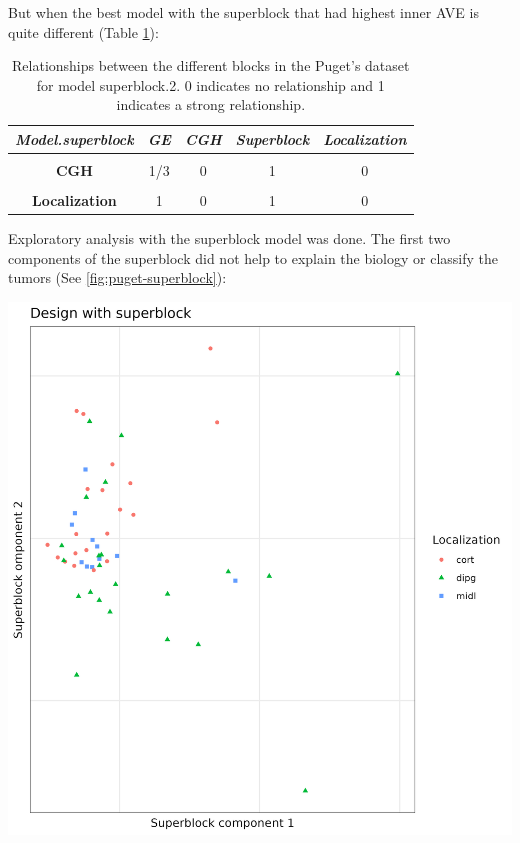 \documentclass[
  12pt,
  a4paper,
  twoside,
  openright]{book}
\let\origfigure\figure
\let\endorigfigure\endfigure
\renewenvironment{figure}[1][2] {
    \expandafter\origfigure\expandafter[!htp]
} {
    \endorigfigure
}
\begin{document}
But when the best model with the superblock that had highest inner AVE is quite different (Table \ref{tab:puget-model-superblock-2}):

\begin{table}[H]

\caption[Model with superblock.2 for the Puget's dataset.]{\label{tab:puget-model-superblock-2}Relationships between the different blocks in the Puget's dataset for model superblock.2. 0 indicates no relationship and 1 indicates a strong relationship.}
\centering
\begin{tabular}[t]{|>{}c|c|c|c|>{}c|}
\hline
\em{\textbf{Model.superblock}} & \em{\textbf{GE}} & \em{\textbf{CGH}} & \em{\textbf{Superblock}} & \em{\textbf{Localization}}\\
\hline
\textbf{\cellcolor{gray!6}{GE}} & \cellcolor{gray!6}{1} & \cellcolor{gray!6}{1/3} & \cellcolor{gray!6}{0} & \cellcolor{gray!6}{1}\\
\hline
\textbf{CGH} & 1/3 & 0 & 1 & 0\\
\hline
\textbf{\cellcolor{gray!6}{Superblock}} & \cellcolor{gray!6}{0} & \cellcolor{gray!6}{1} & \cellcolor{gray!6}{0} & \cellcolor{gray!6}{0}\\
\hline
\textbf{Localization} & 1 & 0 & 1 & 0\\
\hline
\end{tabular}
\end{table}

Exploratory analysis with the superblock model was done.
The first two components of the superblock did not help to explain the biology or classify the tumors (See \ref{fig:puget-superblock}):

\begin{figure}
\includegraphics[width=1\linewidth]{images/pugets_superblock} \caption[Superblock components on Puget's dataset]{First components of the superblock which has all the data of the samples on the Puget's dataset.}\label{fig:puget-superblock}
\end{figure}
\end{document}
